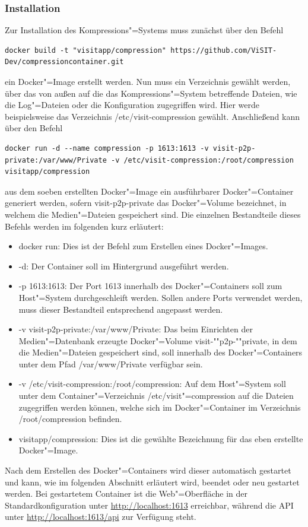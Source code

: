 \subsubsection{Installation}

Zur Installation des Kompressions"=Systems muss zunächst über den Befehl 
\begin{lstlisting}[caption=Befehl zum Erstellen des Docker-Images]
docker build -t "visitapp/compression" https://github.com/ViSIT-Dev/compressioncontainer.git
\end{lstlisting}
ein Docker"=Image erstellt werden. Nun muss ein Verzeichnis gewählt werden, über das von außen auf die das Kompressions"=System betreffende Dateien, wie die Log"=Dateien oder die Konfiguration zugegriffen wird. Hier werde beispielsweise das Verzeichnis {\ttfamily /etc/visit-compression} gewählt. Anschließend kann über den Befehl
\begin{lstlisting}[caption=Befehl zum Erstellen des Docker-Containers]
docker run -d --name compression -p 1613:1613 -v visit-p2p-private:/var/www/Private -v /etc/visit-compression:/root/compression visitapp/compression
\end{lstlisting}
aus dem soeben erstellten Docker"=Image ein ausführbarer Docker"=Container generiert werden, sofern {visit-p2p-private} das Docker"=Volume bezeichnet, in welchem die Medien"=Dateien gespeichert sind. Die einzelnen Bestandteile dieses Befehls werden im folgenden kurz erläutert:
\begin{itemize}
\item {\ttfamily docker run}: Dies ist der Befehl zum Erstellen eines Docker"=Images.
\item {\ttfamily -d}: Der Container soll im Hintergrund ausgeführt werden.
\item {\ttfamily -p 1613:1613}: Der Port 1613 innerhalb des Docker"=Containers soll zum Host"=System durchgeschleift werden. Sollen andere Ports verwendet werden, muss dieser Bestandteil entsprechend angepasst werden.
\item {\ttfamily -v visit-p2p-private:/var/www/Private}: Das beim Einrichten der Medien"=Datenbank erzeugte Docker"=Volume {\ttfamily visit-""p2p-""private}, in dem die Medien"=Dateien gespeichert sind, soll innerhalb des Docker"=Containers unter dem Pfad {\ttfamily /var/www/Private} verfügbar sein.
\item {\ttfamily -v /etc/visit-compression:/root/compression}: Auf dem Host"=System soll unter dem Container"=Verzeichnis {\ttfamily /etc/visit"=compression} auf die Dateien zugegriffen werden können, welche sich im Docker"=Container im Verzeichnis {\ttfamily /root/compression} befinden.
\item {\ttfamily visitapp/compression}: Dies ist die gewählte Bezeichnung für das eben erstellte Docker"=Image.
\end{itemize}
Nach dem Erstellen des Docker"=Containers wird dieser automatisch gestartet und kann, wie im folgenden Abschnitt erläutert wird, beendet oder neu gestartet werden. Bei gestartetem Container ist die Web"=Oberfläche in der Standardkonfiguration unter \url{http://localhost:1613} erreichbar, während die API unter \url{http://localhost:1613/api} zur Verfügung steht.

